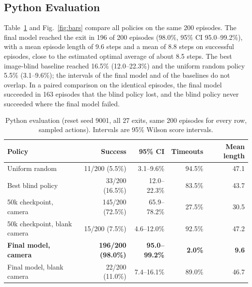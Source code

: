 \documentclass[conference]{IEEEtran}
\begin{document}
\subsection{Python Evaluation}
Table~\ref{tab:python} and Fig.~\ref{fig:bars} compare all policies on the same 200 episodes. The final model reached the exit in 196 of 200 episodes (98.0\%, 95\% CI 95.0--99.2\%), with a mean episode length of 9.6 steps and a mean of 8.8 steps on successful episodes, close to the estimated optimal average of about 8.5 steps. The best image-blind baseline reached 16.5\% (12.0--22.3\%) and the uniform random policy 5.5\% (3.1--9.6\%); the intervals of the final model and of the baselines do not overlap. In a paired comparison on the identical episodes, the final model succeeded in 163 episodes that the blind policy lost, and the blind policy never succeeded where the final model failed.

\begin{table}[!t]
\caption{Python evaluation (reset seed 9001, all 27 exits, same 200 episodes for every row, sampled actions). Intervals are 95\% Wilson score intervals.}
\label{tab:python}
\centering\footnotesize\renewcommand{\arraystretch}{1.12}
\begin{tabular}{@{}lrrrr@{}}
\toprule
Policy & Success & 95\% CI & Timeouts & Mean length \\ \midrule
Uniform random & 11/200 (5.5\%) & 3.1--9.6\% & 94.5\% & 47.1 \\
Best blind policy & 33/200 (16.5\%) & 12.0--22.3\% & 83.5\% & 43.7 \\
50k checkpoint, camera & 145/200 (72.5\%) & 65.9--78.2\% & 27.5\% & 30.5 \\
50k checkpoint, blank camera & 15/200 (7.5\%) & 4.6--12.0\% & 92.5\% & 47.2 \\
\textbf{Final model, camera} & \textbf{196/200 (98.0\%)} & \textbf{95.0--99.2\%} & \textbf{2.0\%} & \textbf{9.6} \\
Final model, blank camera & 22/200 (11.0\%) & 7.4--16.1\% & 89.0\% & 46.7 \\
\bottomrule
\end{tabular}
\end{table}
\end{document}
